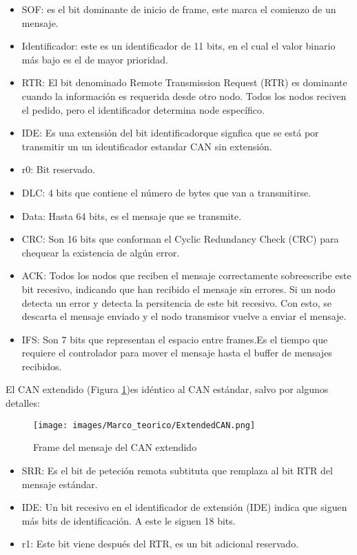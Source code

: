 \begin{itemize}
  \item SOF: es el bit dominante de inicio de frame, este marca el comienzo de un mensaje.
  \item Identificador: este es un identificador de 11 bits, en el cual el valor binario más bajo es el de mayor prioridad.
  \item RTR: El bit denominado Remote Transmission Request (RTR) es dominante cuando la información es requerida desde otro nodo. Todos los nodos reciven el pedido, pero el identificador determina node específico.
  \item IDE: Es una extensión del bit identificadorque signfica que se está por transmitir un un identificador estandar CAN sin extensión.
  \item r0: Bit reservado.
  \item DLC: 4 bits que contiene el  número de bytes que van a transmitirse.
  \item Data: Hasta 64 bits, es el mensaje que se transmite.
  \item CRC: Son 16 bits que conforman el Cyclic Redundancy Check (CRC) para chequear la existencia de algún error.
  \item ACK: Todos los nodos que reciben el mensaje correctamente sobreescribe este bit recesivo, indicando que han recibido el mensaje sin errores. Si un nodo detecta un error y detecta la persitencia de este bit recesivo. Con esto, se descarta el mensaje enviado y el nodo transmisor vuelve a enviar el mensaje.
  \item IFS: Son 7 bits que representan el espacio entre frames.Es el tiempo que requiere el controlador para mover el mensaje hasta el buffer de mensajes recibidos.
\end{itemize}

El CAN extendido (Figura \ref{fig:extendedCAN})es idéntico al CAN estándar, salvo por algunos detalles:

\begin{figure}[h]
 \centering
 \texttt{[image: images/Marco\_teorico/ExtendedCAN.png]}
  \caption{Frame del mensaje del CAN extendido}
\label{fig:extendedCAN}
\end{figure}

\begin{itemize}
  \item SRR: Es el bit de peteción remota subtituta que remplaza al bit RTR del mensaje estándar.
  \item IDE: Un bit recesivo en el identificador de extensión (IDE) indica que siguen más bits de identificación. A este le siguen 18 bits.
  \item r1: Este bit viene después del RTR, es un bit adicional reservado.
\end{itemize}

